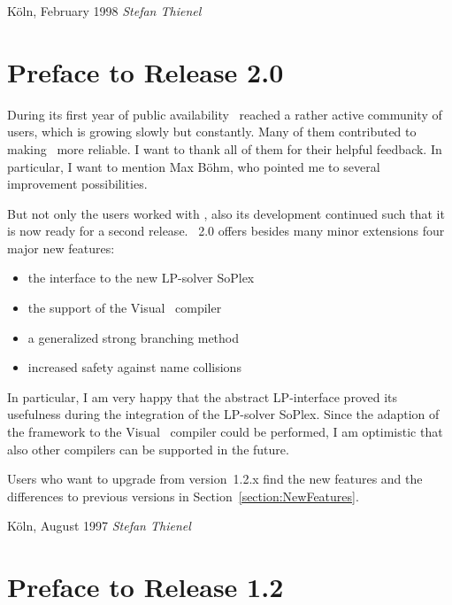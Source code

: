 \bigskip
\bigskip\noindent
{K\"oln, February 1998 \hfill {\it Stefan Thienel}}


\section*{Preface to Release 2.0}

During its first year of public availability \ABACUS\ reached a rather
active community of users, which is growing slowly but
constantly. Many of them contributed to making \ABACUS\ more
reliable. I want to thank all of them for their helpful feedback.
In particular, I want to mention Max B\"ohm, who pointed me to several
improvement possibilities.

But not only the users worked with \ABACUS, also its development
continued such that it is now ready for a second release. \ABACUS~2.0
offers besides many minor extensions four major new features: 
\begin{itemize}
\item the interface to the new LP-solver SoPlex
\item the support of the Visual \CPLUSPLUS\ compiler
\item a generalized strong branching method
\item increased safety against name collisions
\end{itemize}
In particular, I am very happy that the abstract LP-interface proved
its usefulness during the integration of the LP-solver SoPlex. 
Since the adaption of the framework to the Visual \CPLUSPLUS\ compiler
could be performed, I am optimistic that also other compilers can be
supported in the future.

Users who want to upgrade from version~1.2.x find the new features and
the differences to previous versions in Section~\ref{section:NewFeatures}.

\bigskip
\bigskip\noindent
{K\"oln, August 1997 \hfill {\it Stefan Thienel}}

\section*{Preface to Release 1.2}

